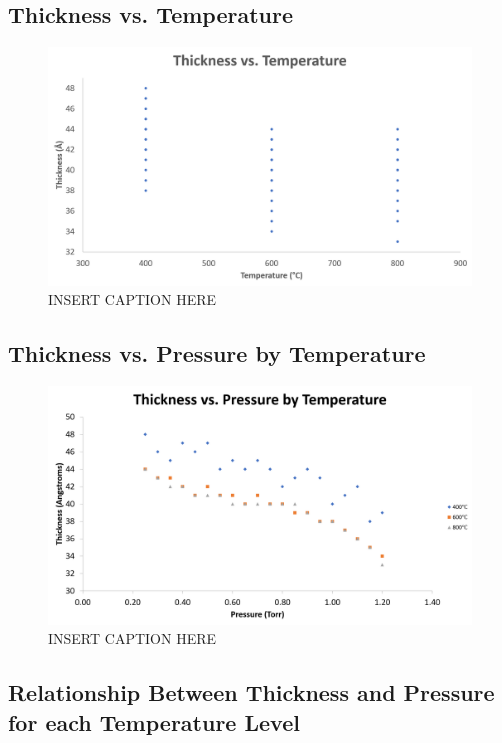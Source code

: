 \documentclass[letterpaper]{article}
\begin{document}
\subsection{Thickness vs. Temperature}

\begin{figure}[H]
 \centering
 \includegraphics[width=\textwidth]{thiccvstemp.png}
 \caption{INSERT CAPTION HERE}
 \label{thiccvstemp}
\end{figure}

\subsection{Thickness vs. Pressure by Temperature}

\begin{figure}[H]
 \centering
 \includegraphics[width=\textwidth]{thiccvspressurebytemp.png}
 \caption{INSERT CAPTION HERE}
 \label{thiccvspressurebytemp}
\end{figure}


\subsection{Relationship Between Thickness and Pressure for each Temperature Level}
\end{document}
